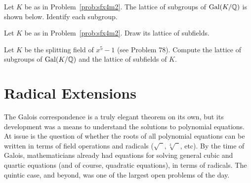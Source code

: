\begin{problem}
    Let $K$ be as in Problem~\ref{prob:sfx4m2}. The lattice of subgroups of $\operatorname{Gal}(K/\mathbb{Q})$ is shown below. Identify each subgroup.
\begin{center}\small
{}
\end{center}
\end{problem}



\begin{problem}
    Let $K$ be as in Problem~\ref{prob:sfx4m2}. Draw its lattice of subfields.
\end{problem}



\begin{problem}
    Let $K$ be the splitting field of $x^5-1$ (see Problem 78). Compute the lattice of subgroups of $\operatorname{Gal}(K/\mathbb{Q})$ and the lattice of subfields of $K$.
\end{problem}



\section{Radical Extensions}

The Galois correspondence is a truly elegant theorem on its own, but its development was a means to understand the solutions to polynomial equations. At issue is the question of whether the roots of all polynomial equations can be written in terms of field operations and radicals ($\sqrt{\phantom{2}}, \sqrt[3]{\phantom{2}}$, etc). By the time of Galois, mathematicians already had equations for solving general cubic and quartic equations (and of course, quadratic equations), in terms of radicals. The quintic case, and beyond, was one of the largest open problems of the day.\medskip

